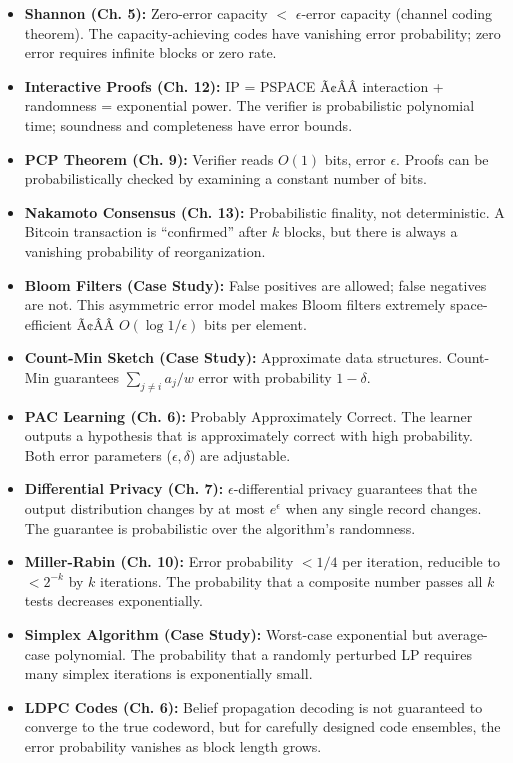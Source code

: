 \begin{itemize}
\item \textbf{Shannon (Ch. 5):} Zero-error capacity $<$ $\epsilon$-error capacity (channel coding theorem). The capacity-achieving codes have vanishing error probability; zero error requires infinite blocks or zero rate.

\item \textbf{Interactive Proofs (Ch. 12):} IP = PSPACE Ã¢ÂÂ interaction + randomness = exponential power. The verifier is probabilistic polynomial time; soundness and completeness have error bounds.

\item \textbf{PCP Theorem (Ch. 9):} Verifier reads $O(1)$ bits, error $\epsilon$. Proofs can be probabilistically checked by examining a constant number of bits.

\item \textbf{Nakamoto Consensus (Ch. 13):} Probabilistic finality, not deterministic. A Bitcoin transaction is ``confirmed'' after $k$ blocks, but there is always a vanishing probability of reorganization.

\item \textbf{Bloom Filters (Case Study):} False positives are allowed; false negatives are not. This asymmetric error model makes Bloom filters extremely space-efficient Ã¢ÂÂ $O(\log 1/\epsilon)$ bits per element.

\item \textbf{Count-Min Sketch (Case Study):} Approximate data structures. Count-Min guarantees $\sum_{j \neq i} a_j / w$ error with probability $1 - \delta$.

\item \textbf{PAC Learning (Ch. 6):} Probably Approximately Correct. The learner outputs a hypothesis that is approximately correct with high probability. Both error parameters ($\epsilon, \delta$) are adjustable.

\item \textbf{Differential Privacy (Ch. 7):} $\epsilon$-differential privacy guarantees that the output distribution changes by at most $e^\epsilon$ when any single record changes. The guarantee is probabilistic over the algorithm's randomness.

\item \textbf{Miller-Rabin (Ch. 10):} Error probability $< 1/4$ per iteration, reducible to $< 2^{-k}$ by $k$ iterations. The probability that a composite number passes all $k$ tests decreases exponentially.

\item \textbf{Simplex Algorithm (Case Study):} Worst-case exponential but average-case polynomial. The probability that a randomly perturbed LP requires many simplex iterations is exponentially small.

\item \textbf{LDPC Codes (Ch. 6):} Belief propagation decoding is not guaranteed to converge to the true codeword, but for carefully designed code ensembles, the error probability vanishes as block length grows.
\end{itemize}

